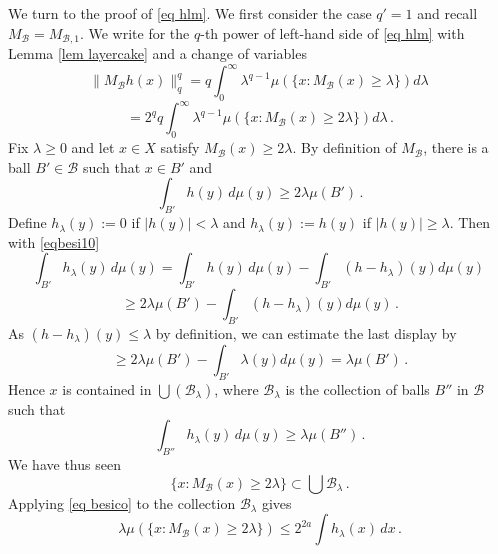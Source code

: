 We turn to the proof of \eqref{eq hlm}. We first consider the case $q'=1$ and recall $M_{\mathcal{B}}=M_{\mathcal{B},1}$.
We write for the $q$-th power of left-hand side of \eqref{eq hlm}
with Lemma \ref{lem layercake}
and a change of variables
\begin{equation}
    \|M_{\mathcal{B}}h(x)\|_q^q
    =q\int _0^{\infty}
    \lambda^{q-1} \mu(\{x: M_{\mathcal{B}}(x)\ge \lambda\}) d\lambda\,
\end{equation}
\begin{equation} \label{eqbesi11}
    =2^q q\int _0^{\infty}
    \lambda^{q-1} \mu(\{x: M_{\mathcal{B}}(x)\ge 2\lambda\}) d\lambda\, .
\end{equation}
Fix $\lambda\ge 0$ and let $x\in X$ satisfy $M_{\mathcal{B}}(x)\ge 2\lambda$. By definition of $M_{\mathcal{B}}$, there is a ball
$B'\in \mathcal{B}$ such that
$x\in B'$ and
\begin{equation}\label{eqbesi10}
\int_{B'} h(y)\, d\mu(y)\ge 2\lambda \mu({B'})   \, .
\end{equation}
Define
$h_\lambda(y):=0$ if $|h(y)|<\lambda$ and $h_\lambda(y):=h(y)$ if $|h(y)|\ge \lambda$.
Then with \eqref{eqbesi10}
\begin{equation}
\int_{B'} h_\lambda (y)\, d\mu(y)
=\int_{B'} h (y)\, d\mu(y)-
\int_{B'} (h-h_\lambda) (y) d\mu(y)\,
\end{equation}
\begin{equation}
\ge 2\lambda \mu({B'})-
\int_{B'} (h-h_\lambda) (y) d\mu(y)\, .
\end{equation}
As $(h-h_\lambda)(y)\le \lambda$
by definition, we can estimate the last display by
\begin{equation}
\ge 2\lambda \mu({B'})-
\int_{B'} \lambda  (y) d\mu(y)
=\lambda \mu({B'})\, .
\end{equation}
Hence $x$ is contained in
$\bigcup(\mathcal{B}_\lambda)$, 
where $\mathcal{B}_\lambda$
is the collection of balls $B''$ in $\mathcal{B}$ such that
\begin{equation}
    \int_{B''} h_\lambda (y)\, d\mu(y)\ge \lambda \mu(B'')\, .
\end{equation}
We have thus seen
\begin{equation}
    \{x: M_{\mathcal{B}}(x)\ge 2\lambda\}\subset
    \bigcup \mathcal{B}_\lambda
\, .
\end{equation}
Applying  \eqref{eq besico} to the  collection $\mathcal{B}_\lambda$
gives
\begin{equation}
    \lambda \mu(\{x: M_{\mathcal{B}}(x)\ge 2\lambda\})\le
    2^{2a}
    \int h_\lambda (x)\, dx\, .
\end{equation}
